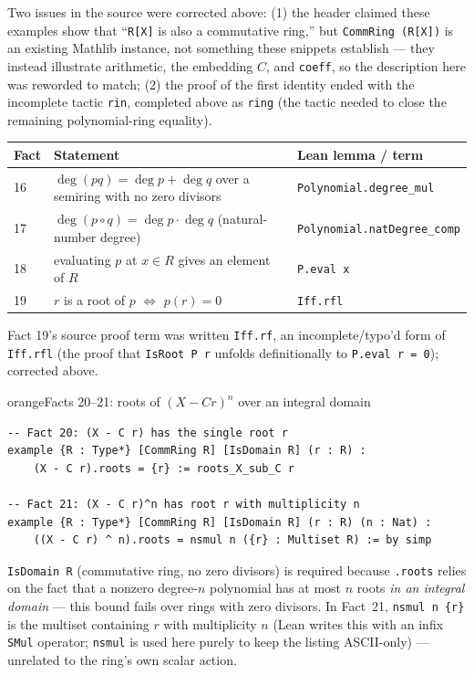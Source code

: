 \documentclass[11pt]{article}
\begin{document}
\begin{auditnote}
Two issues in the source were corrected above: (1) the header claimed these examples show that ``\verb|R[X]| is also a commutative ring,'' but \verb|CommRing (R[X])| is an existing Mathlib instance, not something these snippets establish --- they instead illustrate arithmetic, the embedding $C$, and \verb|coeff|, so the description here was reworded to match; (2) the proof of the first identity ended with the incomplete tactic \verb|rin|, completed above as \verb|ring| (the tactic needed to close the remaining polynomial-ring equality).
\end{auditnote}

\renewcommand{\arraystretch}{1.3}
\begin{center}
\begin{tabular}{@{}p{1.3cm}p{7cm}p{5.5cm}@{}}
\toprule
\textbf{Fact} & \textbf{Statement} & \textbf{Lean lemma / term} \\
\midrule
16 & $\deg(pq) = \deg p + \deg q$ over a semiring with no zero divisors & \verb|Polynomial.degree_mul| \\
17 & $\deg(p\circ q) = \deg p \cdot \deg q$ (natural-number degree) & \verb|Polynomial.natDegree_comp| \\
18 & evaluating $p$ at $x\in R$ gives an element of $R$ & \verb|P.eval x| \\
19 & $r$ is a root of $p$ $\iff$ $p(r)=0$ & \verb|Iff.rfl| \\
\bottomrule
\end{tabular}
\end{center}

\begin{auditnote}
Fact 19's source proof term was written \verb|Iff.rf|, an incomplete/typo'd form of \verb|Iff.rfl| (the proof that \verb|IsRoot P r| unfolds definitionally to \verb|P.eval r = 0|); corrected above.
\end{auditnote}

\begin{defbox}{orange}{Facts 20--21: roots of \texorpdfstring{$(X-C r)^n$}{(X-Cr)\^{}n} over an integral domain}
\begin{lstlisting}
-- Fact 20: (X - C r) has the single root r
example {R : Type*} [CommRing R] [IsDomain R] (r : R) :
    (X - C r).roots = {r} := roots_X_sub_C r

-- Fact 21: (X - C r)^n has root r with multiplicity n
example {R : Type*} [CommRing R] [IsDomain R] (r : R) (n : Nat) :
    ((X - C r) ^ n).roots = nsmul n ({r} : Multiset R) := by simp
\end{lstlisting}
\verb|IsDomain R| (commutative ring, no zero divisors) is required because \verb|.roots| relies on the fact that a nonzero degree-$n$ polynomial has at most $n$ roots \emph{in an integral domain} --- this bound fails over rings with zero divisors. In Fact~21, \verb|nsmul n {r}| is the multiset containing $r$ with multiplicity $n$ (Lean writes this with an infix \texttt{SMul} operator; \verb|nsmul| is used here purely to keep the listing ASCII-only) --- unrelated to the ring's own scalar action.
\end{defbox}
\end{document}
